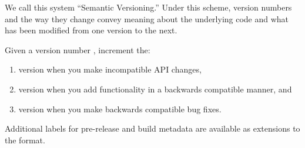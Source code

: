 \begin{flushleft}
	We call this system ``Semantic Versioning.'' Under this scheme, version numbers and the way they
	change convey meaning about the underlying code and what has been modified from one version to the
	next.
\end{flushleft}

\begin{flushleft}
	Given a version number , increment the:
\end{flushleft}

\begin{enumerate}
	\item {} version when you make incompatible API changes,
	\item {} version when you add functionality in a backwards compatible manner, and
	\item {} version when you make backwards compatible bug fixes.
\end{enumerate}

\begin{flushleft}
	Additional labels for pre-release and build metadata are available as extensions to the
	 format.
\end{flushleft}
